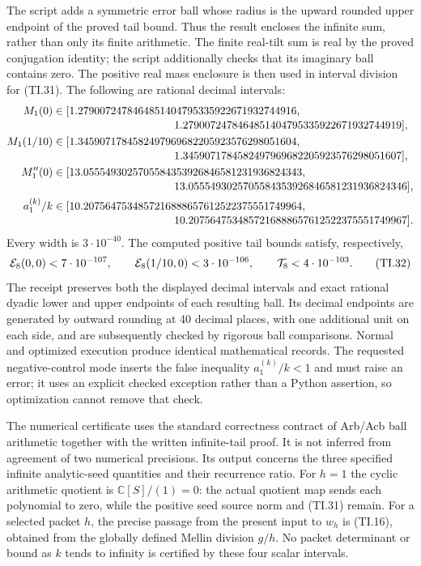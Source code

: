 The script adds a symmetric error ball whose radius is the upward
rounded upper endpoint of the proved tail bound. Thus the result
encloses the infinite sum, rather than only its finite arithmetic.
The finite real-tilt sum is real by the proved conjugation identity;
the script additionally checks that its imaginary ball contains zero.
The positive real mass enclosure is then used in interval division
for (TI.31). The following are rational decimal intervals:
\begin{align*}
 M_1(0)&\in[
 1.2790072478464851404795335922671932744916,\\[-2pt]
 &\hspace{39mm}1.2790072478464851404795335922671932744919],\\
 M_1(1/10)&\in[
 1.3459071784582497969682205923576298051604,\\[-2pt]
 &\hspace{39mm}1.3459071784582497969682205923576298051607],\\
 M_1''(0)&\in[
 13.0555493025705584353926846581231936824343,\\[-2pt]
 &\hspace{39mm}13.0555493025705584353926846581231936824346],\\
 a_1^{(k)}/k&\in[
 10.2075647534857216888657612522375551749964,\\[-2pt]
 &\hspace{39mm}10.2075647534857216888657612522375551749967].
\end{align*}
Every width is $3\cdot10^{-40}$. The computed positive tail bounds
satisfy, respectively,
\begin{equation}
 {\cal E}_8(0,0)<7\cdot10^{-107},\qquad
 {\cal E}_8(1/10,0)<3\cdot10^{-106},\qquad
 {\cal T}_8<4\cdot10^{-103}. \tag{TI.32}
\end{equation}
The receipt preserves both the displayed decimal intervals and exact
rational dyadic lower and upper endpoints of each resulting ball.
Its decimal endpoints are generated by outward rounding at 40 decimal
places, with one additional unit on each side, and are subsequently
checked by rigorous ball comparisons. Normal and optimized execution
produce identical mathematical records. The requested negative-control
mode inserts the false inequality $a_1^{(k)}/k<1$ and must raise an
error; it uses an explicit checked exception rather than a Python
assertion, so optimization cannot remove that check.

The numerical certificate uses the standard correctness contract of
Arb/Acb ball arithmetic together with the written infinite-tail proof.
It is not inferred from agreement of two numerical precisions. Its
output concerns the three specified infinite analytic-seed quantities
and their recurrence ratio. For $h=1$ the cyclic arithmetic quotient
is $\mathbb C[S]/(1)=0$: the actual quotient map sends each polynomial
to zero, while the positive seed source norm and (TI.31) remain.
For a selected packet $h$, the precise passage from the present input
to $w_h$ is (TI.16), obtained from the globally defined Mellin division
$g/h$. No packet determinant or bound as $k$ tends to infinity is
certified by these four scalar intervals.

\endgroup

